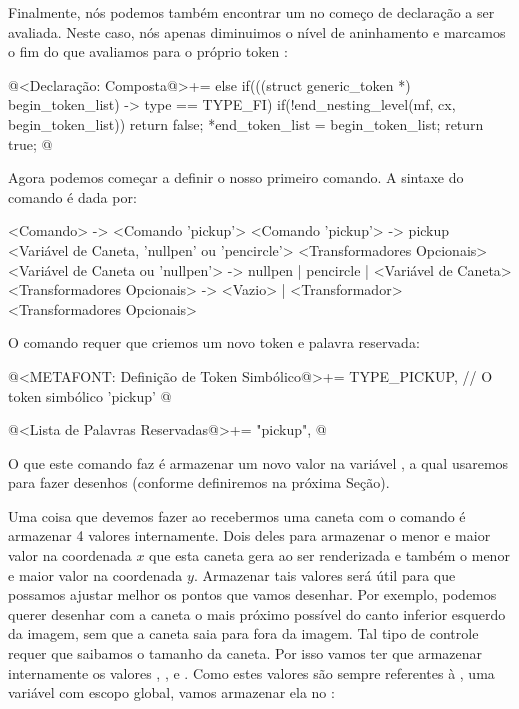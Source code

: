 {Finalmente, nós podemos também encontrar um  no começo
de declaração a ser avaliada. Neste caso, nós apenas diminuimos o
nível de aninhamento e marcamos o fim do que avaliamos para o próprio
token :

\iniciocodigo
@<Declaração: Composta@>+=
else if(((struct generic_token *) begin_token_list) -> type == TYPE_FI){
  if(!end_nesting_level(mf, cx, begin_token_list))
    return false;
  *end_token_list = begin_token_list;
  return true;
}
@
\fimcodigo


Agora podemos começar a definir o nosso primeiro comando. A sintaxe do
comando  é dada por:

\alinhaverbatim
<Comando> -> <Comando 'pickup'>
<Comando 'pickup'> -> pickup <Variável de Caneta, 'nullpen' ou 'pencircle'>
                             <Transformadores Opcionais>
<Variável de Caneta ou 'nullpen'> -> nullpen | pencircle | <Variável de Caneta>
<Transformadores Opcionais> -> <Vazio> |
                               <Transformador> <Transformadores Opcionais>
\alinhanormal

O comando requer que criemos um novo token e palavra reservada:

\iniciocodigo
@<METAFONT: Definição de Token Simbólico@>+=
TYPE_PICKUP,   // O token simbólico 'pickup'
@
\fimcodigo

\iniciocodigo
@<Lista de Palavras Reservadas@>+=
"pickup",
@
\fimcodigo

O que este comando faz é armazenar um novo valor na
variável , a qual usaremos para fazer desenhos
(conforme definiremos na próxima Seção).


Uma coisa que devemos fazer ao recebermos uma caneta com o
comando  é armazenar 4 valores internamente. Dois
deles para armazenar o menor e maior valor na coordenada $x$ que esta
caneta gera ao ser renderizada e também o menor e maior valor na
coordenada $y$. Armazenar tais valores será útil para que possamos
ajustar melhor os pontos que vamos desenhar. Por exemplo, podemos
querer desenhar com a caneta o mais próximo possível do canto inferior
esquerdo da imagem, sem que a caneta saia para fora da imagem. Tal
tipo de controle requer que saibamos o tamanho da caneta. Por isso
vamos ter que armazenar internamente os
valores , , 
e . Como estes valores são sempre referentes
à , uma variável com escopo global, vamos
armazenar ela no :

}
